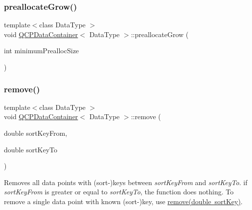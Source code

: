 \mbox{\label{class_q_c_p_data_container_aae8cdb2bcc3b900ec22f26df3e7d67c7}} 
\subsubsection{\texorpdfstring{preallocateGrow()}{preallocateGrow()}}
{\footnotesize\ttfamily template$<$class Data\+Type $>$ \\
void \mbox{\hyperlink{class_q_c_p_data_container}{Q\+C\+P\+Data\+Container}}$<$ Data\+Type $>$\+::preallocate\+Grow (\begin{DoxyParamCaption}\item[{int}]{minimum\+Prealloc\+Size }\end{DoxyParamCaption})\hspace{0.3cm}{\ttfamily [protected]}}

\mbox{\label{class_q_c_p_data_container_ae5f569a120648b167efa78835f12fd38}} 
\subsubsection{\texorpdfstring{remove()}{remove()}\hspace{0.1cm}{\footnotesize\ttfamily [1/2]}}
{\footnotesize\ttfamily template$<$class Data\+Type $>$ \\
void \mbox{\hyperlink{class_q_c_p_data_container}{Q\+C\+P\+Data\+Container}}$<$ Data\+Type $>$\+::remove (\begin{DoxyParamCaption}\item[{double}]{sort\+Key\+From,  }\item[{double}]{sort\+Key\+To }\end{DoxyParamCaption})}

Removes all data points with (sort-\/)keys between {\itshape sort\+Key\+From} and {\itshape sort\+Key\+To}. if {\itshape sort\+Key\+From} is greater or equal to {\itshape sort\+Key\+To}, the function does nothing. To remove a single data point with known (sort-\/)key, use \mbox{\hyperlink{class_q_c_p_data_container_a2dbded7f0732bacf9db48fdfbbb620bc}{remove(double sort\+Key)}}.

